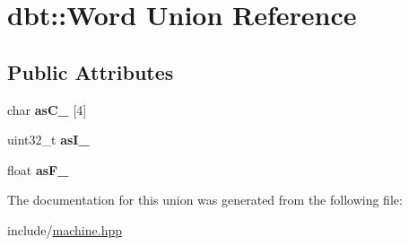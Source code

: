 \hypertarget{uniondbt_1_1_word}{}\section{dbt\+:\+:Word Union Reference}
\label{uniondbt_1_1_word}
\subsection*{Public Attributes}
\begin{DoxyCompactItemize}
\item 
char {\bfseries as\+C\+\_\+} \mbox{[}4\mbox{]}\hypertarget{uniondbt_1_1_word_acd880c307af6c42c22bfe279eec488b1}{}\label{uniondbt_1_1_word_acd880c307af6c42c22bfe279eec488b1}

\item 
uint32\+\_\+t {\bfseries as\+I\+\_\+}\hypertarget{uniondbt_1_1_word_a28b54faff1a9812717cdda1055cbf013}{}\label{uniondbt_1_1_word_a28b54faff1a9812717cdda1055cbf013}

\item 
float {\bfseries as\+F\+\_\+}\hypertarget{uniondbt_1_1_word_a62bfb80189eaf4b788ad7cddd7f6b612}{}\label{uniondbt_1_1_word_a62bfb80189eaf4b788ad7cddd7f6b612}

\end{DoxyCompactItemize}


The documentation for this union was generated from the following file\+:\begin{DoxyCompactItemize}
\item 
include/\hyperlink{machine_8hpp}{machine.\+hpp}\end{DoxyCompactItemize}
